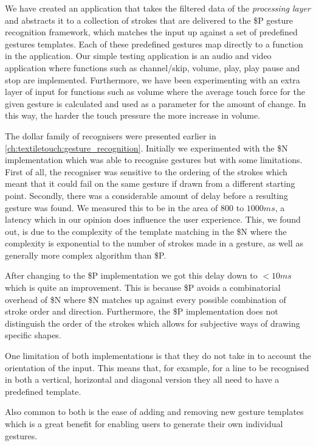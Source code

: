 We have created an application that takes the filtered data of the \emph{processing layer} and abstracts it to a collection of strokes that are delivered to the \$P gesture recognition framework, which matches the input up against a set of predefined gestures templates.
Each of these predefined gestures map directly to a function in the application.
Our simple testing application is an audio and video application where functions such as channel/skip, volume, play, play pause and stop are implemented.
Furthermore, we have been experimenting with an extra layer of input for functions such as volume where the average touch force for the given gesture is calculated and used as a parameter for the amount of change.
In this way, the harder the touch pressure the more increase in volume.

The dollar family of recognisers were presented earlier in \ref{ch:textiletouch:gesture_recognition}.
Initially we experimented with the \$N implementation which was able to recognise gestures but with some limitations.
First of all, the recogniser was sensitive to the ordering of the strokes which meant that it could fail on the same gesture if drawn from a different starting point.
Secondly, there was a considerable amount of delay before a resulting gesture was found.
We measured this to be in the area of \(800\) to \(1000 ms\), a latency which in our opinion does influence the user experience.
This, we found out, is due to the complexity of the template matching in the \$N where the complexity is exponential to the number of strokes made in a gesture, as well as generally more complex algorithm than \$P.

After changing to the \$P implementation we got this delay down to \(< 10 ms\) which is quite an improvement.
This is because \$P avoids a combinatorial overhead of \$N where \$N matches up against every possible combination of stroke order and direction.
Furthermore, the \$P implementation does not distinguish the order of the strokes which allows for subjective ways of drawing specific shapes.

One limitation of both implementations is that they do not take in to account the orientation of the input. 
This means that, for example, for a line to be recognised in both a vertical, horizontal and diagonal version they all need to have a predefined template. 

Also common to both is the ease of adding and removing new gesture templates which is a great benefit for enabling users to generate their own individual gestures.

